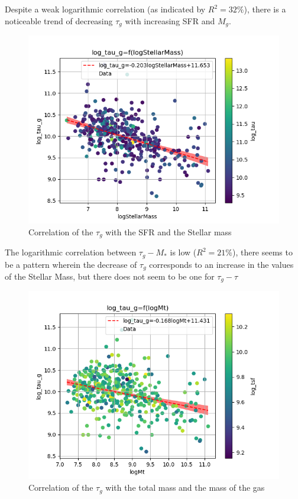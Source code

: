 \documentclass[a4paper,twocolumn]{article}
\begin{document}
Despite a weak logarithmic correlation (as indicated by \(R^2 = 32\%\)), there is a noticeable trend of decreasing \(\tau_g\) with increasing SFR and \(M_g\).

\begin{figure}[!htpb]
\centering
\includegraphics[width=.9\linewidth]{./figs/logStellarMass-log_tau_g-color_log_tau.png}
\caption{\label{fig:Correlation of the $\tau_g$ with the SFR and the Stellar mass}Correlation of the \(\tau_g\) with the SFR and the Stellar mass}
\end{figure}

The logarithmic correlation between \(\tau_g-M_*\) is low (\(R^2 = 21\%\)), there seems to be a pattern wherein the decrease of \(\tau_g\) corresponds to an increase in the values of the Stellar Mass, but there does not seem to be one for \(\tau_g-\tau\)

\begin{figure}[!htpb]
\centering
\includegraphics[width=.9\linewidth]{./figs/logMt-log_tau_g-color_log_tsf.png}
\caption{\label{fig:Correlation of the $\tau_g$ with the total mass and the mass of the gas}Correlation of the \(\tau_g\) with the total mass and the mass of the gas}
\end{figure}
\end{document}
